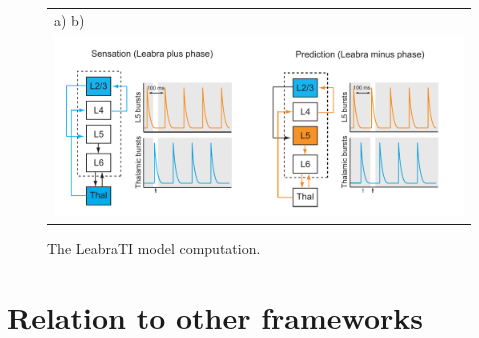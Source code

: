 \documentclass[dwyatte_dissertation.tex]{subfiles}
\begin{document}
\begin{figure}[h!]
\begin{center}
\begin{tabular}{ll}
a) \hspace{76mm} b) \\
\multicolumn{2}{c}{\includegraphics[width=160mm]{figs/chap_leabrati/leabrati_comp.pdf}} \\
\end{tabular}
\end{center}
\caption{The LeabraTI model computation.}
\label{fig:leabrati_comp}
\end{figure}


\section{Relation to other frameworks}
\end{document}
